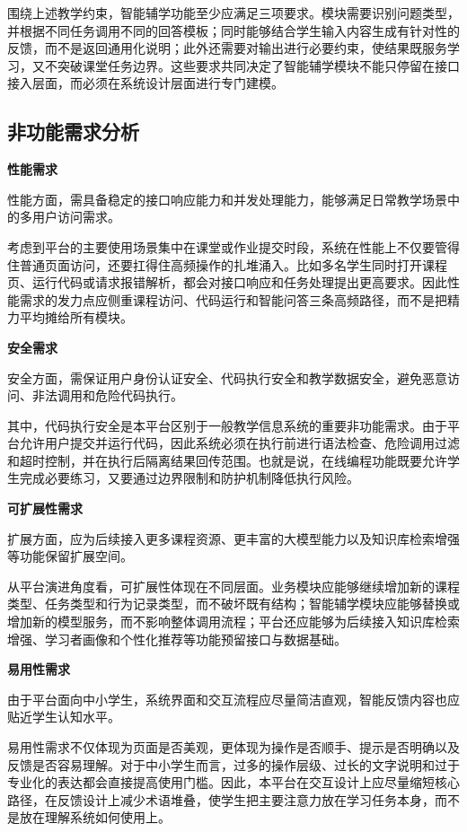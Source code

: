 围绕上述教学约束，智能辅学功能至少应满足三项要求。模块需要识别问题类型，并根据不同任务调用不同的回答模板；同时能够结合学生输入内容生成有针对性的反馈，而不是返回通用化说明；此外还需要对输出进行必要约束，使结果既服务学习，又不突破课堂任务边界。这些要求共同决定了智能辅学模块不能只停留在接口接入层面，而必须在系统设计层面进行专门建模。

\subsection{非功能需求分析}
\textbf{性能需求}

性能方面，需具备稳定的接口响应能力和并发处理能力，能够满足日常教学场景中的多用户访问需求。

考虑到平台的主要使用场景集中在课堂或作业提交时段，系统在性能上不仅要管得住普通页面访问，还要扛得住高频操作的扎堆涌入。比如多名学生同时打开课程页、运行代码或请求报错解析，都会对接口响应和任务处理提出更高要求。因此性能需求的发力点应侧重课程访问、代码运行和智能问答三条高频路径，而不是把精力平均摊给所有模块。

\textbf{安全需求}

安全方面，需保证用户身份认证安全、代码执行安全和教学数据安全，避免恶意访问、非法调用和危险代码执行。

其中，代码执行安全是本平台区别于一般教学信息系统的重要非功能需求。由于平台允许用户提交并运行代码，因此系统必须在执行前进行语法检查、危险调用过滤和超时控制，并在执行后隔离结果回传范围。也就是说，在线编程功能既要允许学生完成必要练习，又要通过边界限制和防护机制降低执行风险。

\textbf{可扩展性需求}

扩展方面，应为后续接入更多课程资源、更丰富的大模型能力以及知识库检索增强等功能保留扩展空间。

从平台演进角度看，可扩展性体现在不同层面。业务模块应能够继续增加新的课程类型、任务类型和行为记录类型，而不破坏既有结构；智能辅学模块应能够替换或增加新的模型服务，而不影响整体调用流程；平台还应能够为后续接入知识库检索增强、学习者画像和个性化推荐等功能预留接口与数据基础。

\textbf{易用性需求}

由于平台面向中小学生，系统界面和交互流程应尽量简洁直观，智能反馈内容也应贴近学生认知水平。

易用性需求不仅体现为页面是否美观，更体现为操作是否顺手、提示是否明确以及反馈是否容易理解。对于中小学生而言，过多的操作层级、过长的文字说明和过于专业化的表达都会直接提高使用门槛。因此，本平台在交互设计上应尽量缩短核心路径，在反馈设计上减少术语堆叠，使学生把主要注意力放在学习任务本身，而不是放在理解系统如何使用上。

